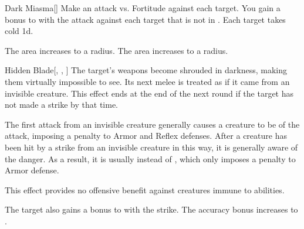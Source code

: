 \lowercase{\hypertarget{spell:Dark Miasma}{}}\label{spell:Dark Miasma}
\begin{freeability}[Rank 3]{\hypertarget{spell:Dark Miasma}{Dark Miasma}}[]
Make an attack vs. Fortitude against each target.
You gain a  bonus to  with the attack against each target that is not in .
\hit Each target takes cold  \minus1d.

\rankline
{} The area increases to a \areamed radius.
 The area increases to a \arealarge radius.

\end{freeability}
\vspace{0.25em}



\lowercase{\hypertarget{spell:Hidden Blade}{}}\label{spell:Hidden Blade}
\begin{freeability}[Rank 3]{\hypertarget{spell:Hidden Blade}{Hidden Blade}}[, , ]
The target's weapons become shrouded in darkness, making them virtually impossible to see.
Its next melee  is treated as if it came from an invisible creature.
This effect ends at the end of the next round if the target has not made a strike by that time.

The first attack from an invisible creature generally causes a creature to be  of the attack, imposing a  penalty to Armor and Reflex defenses.
After a creature has been hit by a strike from an invisible creature in this way, it is generally aware of the danger.
As a result, it is usually  instead of , which only imposes a  penalty to Armor defense.

This effect provides no offensive benefit against creatures immune to  abilities.

\rankline
{} The target also gains a  bonus to  with the strike.
 The accuracy bonus increases to .

\end{freeability}
\vspace{0.25em}



